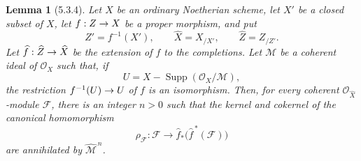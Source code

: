 \documentclass[oneside]{amsart}
\theoremstyle{ega-env-style}
\theoremstyle{ega-thm-env-style}
\newtheorem*{lemma}{Lemma}
\theoremstyle{ega-defn-env-style}
\def\mathcal{\mathscr}
\def\sh{\mathcal}                   %
\def\Supp{\operatorname{Supp}}
\renewcommand{\to}{\mathchoice{\longrightarrow}{\rightarrow}{\rightarrow}{\rightarrow}}
\let\EGAOriginalLabel\label
\renewcommand{\label}[1]{\phantomsection\EGAOriginalLabel{#1}}
\begin{document}
\begin{lemma}[5.3.4]
\label{III.5.3.4}
Let $X$ be an ordinary Noetherian scheme, let $X'$ be a closed
subset of $X$, let $f:Z\to X$ be a proper morphism, and put
\[
  Z'=f^{-1}(X'),\qquad
  \widehat{X}=X_{/X'},\qquad
  \widehat{Z}=Z_{/Z'}.
\]
Let $\widehat{f}:\widehat{Z}\to\widehat{X}$ be the extension of $f$
to the completions.  Let $\sh{M}$ be a coherent ideal of
$\sh{O}_X$ such that, if
\[
  U=X-\Supp(\sh{O}_X/\sh{M}),
\]
the restriction $f^{-1}(U)\to U$ of $f$ is an isomorphism.  Then,
for every coherent $\sh{O}_{\widehat{X}}$-module $\sh{F}$, there is
an integer $n>0$ such that the kernel and cokernel of the canonical
homomorphism
\[
  \rho_{\sh{F}}:
  \sh{F}\longrightarrow
  \widehat{f}_*\bigl(\widehat{f}^{\,*}(\sh{F})\bigr)
\]
 are annihilated by
$\widehat{\sh{M}}^{\,n}$.
\end{lemma}
\end{document}
